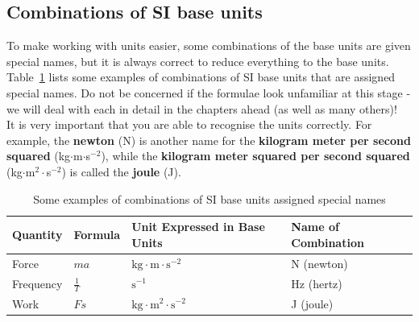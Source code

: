 \subsection*{Combinations of SI base units}
            \nopagebreak
To make working with units easier, some combinations of the base units are given special names, but it is always correct to reduce everything to the base units. Table~\ref{tab:SIcombinations} lists some examples of combinations of SI base units that are assigned special names. Do not be concerned if the formulae look unfamiliar at this stage - we will deal with each in detail in the chapters ahead (as well as many others)! \\ 
It is very important that you are able to recognise the units correctly. For example, the \textbf{newton} (N) is another name for the \textbf{kilogram meter per second squared} (kg$\ensuremath{\cdot}$m$\ensuremath{\cdot}$s${}^{-2}$), while the \textbf{kilogram meter squared per second squared} (kg$\ensuremath{\cdot}$m${}^{2}\ensuremath{\cdot}$s${}^{-2}$) is called the \textbf{joule} (J).
          \begin{table}[H]
        \begin{center}
\noindent
      \begin{tabular}{|l|l|l|l|}\hline
\textbf{Quantity} & \textbf{Formula} & \textbf{Unit Expressed in Base Units}              & \textbf{Name of Combination} \\ \hline
Force             & $ma$             & $\text{kg}\cdot \text{m} \cdot \text{s}^{-2}$      & N (newton)                   \\ \hline
Frequency         & $\frac{1}{T}$    & $\text{s}^{-1}$                                    & Hz (hertz)                   \\ \hline
Work              & $Fs$             & $\text{kg} \cdot \text{m}^{2} \cdot \text{s}^{-2}$ & J (joule)                    \\ \hline
    \end{tabular}
\caption{Some examples of combinations of SI base units assigned special names}
\label{tab:SIcombinations}
      \end{center}
\end{table}
    \par
\label{m30853*notfhsst!!!underscore!!!id306}

